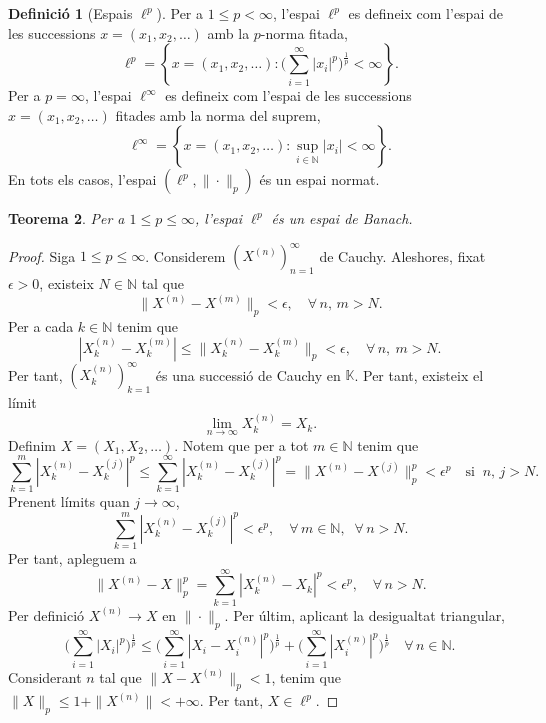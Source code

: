 \documentclass[12pt]{book}
\newtheorem{teorema}{Teorema}[chapter]
\theoremstyle{definition}
\newtheorem{defi}[teorema]{Definició}
\theoremstyle{nota}
\theoremstyle{exemple}
\begin{document}
\begin{defi}[Espais $\ell^p$]
  Per a $1 \leq p < \infty$, l'espai $\ell^p$ es defineix com l'espai
  de les successions $x = (x_1, x_2, \dotsc)$ amb la $p$-norma fitada,
  \[
    \ell^p = \left\{ x = (x_1, x_2, \dotsc) : \Big(
      \sum_{i=1}^{\infty} |x_i|^p \Big)^{\frac{1}{p}} < \infty
    \right\}.
  \]
  Per a $p = \infty$, l'espai $\ell^\infty$ es defineix com l'espai de
  les successions $x = (x_1, x_2, \dotsc)$ fitades amb la norma del
  suprem,
  \[
    \ell^\infty = \left\{ x = (x_1, x_2, \dotsc) : \sup_{i \in
        \mathbb{N}} |x_i| < \infty \right\}.
  \]
  En tots els casos, l'espai $(\ell^p, \|\cdot\|_p)$ és un espai
  normat.
\end{defi}

\begin{teorema}
  Per a $1 \leq p \leq \infty$, l'espai $\ell^p$ és un espai de
  Banach.
\end{teorema}

\begin{proof}
  Siga $1 \leq p \leq \infty$. Considerem $(X^{(n)})_{n=1}^\infty$ de
  Cauchy. Aleshores, fixat $\epsilon > 0$, existeix $N \in \mathbb{N}$
  tal que
  \[
    \|X^{(n)}-X^{(m)}\|_p < \epsilon, \quad \forall\,n,\,m > N.
  \]
  Per a cada $k \in \mathbb{N}$ tenim que
  \[
    |X_k^{(n)}-X_k^{(m)}| \leq \|X_k^{(n)}-X_k^{(m)}\|_p < \epsilon,
    \quad \forall\,n,\ m > N.
  \]
  Per tant, $(X_k^{(n)})_{k=1}^\infty$ és una successió de Cauchy en
  $\mathbb{K}$. Per tant, existeix el límit
  \[
    \lim_{n\to\infty} X_k^{(n)} = X_k.
  \]
  Definim $X = (X_1, X_2, \dotsc)$. Notem que per a tot
  $m \in \mathbb{N}$ tenim que
  \[
    \sum_{k=1}^m |X_k^{(n)}-X_k^{(j)}|^p \leq
    \sum_{k=1}^{\infty}|X_k^{(n)} - X_k^{(j)}|^p = \|X^{(n)} -
    X^{(j)}\|_p^p < \epsilon^p \quad \text{si} \;\; n,\,j > N.
  \]
  Prenent límits quan $j \to \infty$,
  \[
    \sum_{k=1}^{m}|X_k^{(n)} - X_k^{(j)}|^p < \epsilon^p, \quad
    \forall\,m \in \mathbb{N},\;\; \forall\,n > N.
  \]
  Per tant, apleguem a
  \[
    \|X^{(n)}-X\|_p^p = \sum_{k=1}^{\infty} |X_k^{(n)}-X_k|^p <
    \epsilon^p, \quad \forall \, n > N.
  \]
  Per definició $X^{(n)} \to X$ en $\|\cdot\|_p$. Per últim, aplicant
  la desigualtat triangular,
  \[
    \Big( \sum_{i=1}^\infty |X_i|^p \Big)^{\frac{1}{p}} \leq
    \Big( \sum_{i=1}^\infty |X_i - X_i^{(n)}|^p \Big)^{\frac{1}{p}} +
    \Big( \sum_{i=1}^\infty |X_i^{(n)}|^p \Big)^{\frac{1}{p}}
    \quad \forall \, n \in \mathbb{N}.
  \]
  Considerant $n$ tal que $\|X-X^{(n)}\|_p < 1$, tenim que
  $\|X\|_p \leq 1 + \|X^{(n)}\| < +\infty$. Per tant, $X \in \ell^p$.
\end{proof}
\end{document}
